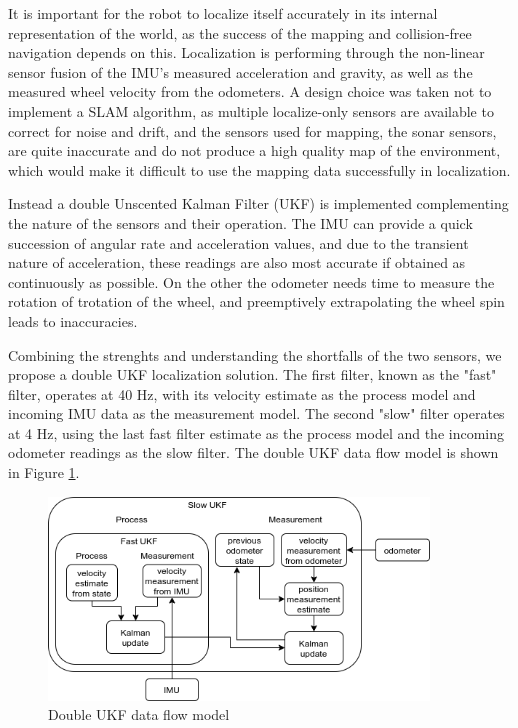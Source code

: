 It is important for the robot to localize itself accurately in its internal representation of the world, as the success of the mapping and collision-free navigation depends on this. Localization is performing through the non-linear sensor fusion of the IMU's measured acceleration and gravity, as well as the measured wheel velocity from the odometers. A design choice was taken not to implement a SLAM algorithm, as multiple localize-only sensors are available to correct for noise and drift, and the sensors used for mapping, the sonar sensors, are quite inaccurate and do not produce a high quality map of the environment, which would make it difficult to use the mapping data successfully in localization. 

Instead a double Unscented Kalman Filter (UKF) is implemented complementing the nature of the sensors and their operation. The IMU can provide a quick succession of angular rate and acceleration values, and due to the transient nature of acceleration, these readings are also most accurate if obtained as continuously as possible. On the other the odometer needs time to measure the rotation of trotation of the wheel, and preemptively extrapolating the wheel spin leads to inaccuracies. 

Combining the strenghts and understanding the shortfalls of the two sensors, we propose a double UKF localization solution. The first filter, known as the "fast" filter, operates at 40 Hz, with its velocity estimate as the process model and incoming IMU data as the measurement model. The second "slow" filter operates at 4 Hz, using the last fast filter estimate as the process model and the incoming odometer readings as the slow filter. The double UKF data flow model is shown in Figure \ref{fig:dukf}.

\begin{figure}
    \centering
    \includegraphics[width=0.9\textwidth]{figures/dukf.png}
    \caption{Double UKF data flow model}
    \label{fig:dukf}
\end{figure}

